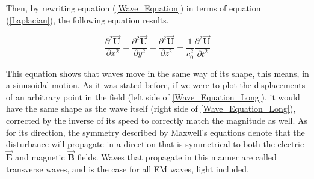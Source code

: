 Then, by rewriting equation (\ref{Wave_Equation}) in terms of equation (\ref{Laplacian}), the following equation results.

\begin{equation}
    \frac{\partial^2 \overrightarrow{\textbf{U}}}{\partial x^2} + \frac{\partial^2 \overrightarrow{\textbf{U}}}{\partial y^2} + \frac{\partial^2 \overrightarrow{\textbf{U}}}{\partial z^2} = \frac{1}{c_0^2}\frac{\partial^2 \overrightarrow{\textbf{U}}}{\partial t^2}
    \label{Wave_Equation_Long}
\end{equation}

This equation shows that waves move in the same way of its shape, this means, in a sinusoidal motion. As it was stated before, if we were to plot the displacements of an arbitrary point in the field (left side of \ref{Wave_Equation_Long}), it would have the same shape as the wave itself (right side of \ref{Wave_Equation_Long}), corrected by the inverse of its speed to correctly match the magnitude as well. As for its direction, the symmetry described by Maxwell's equations denote that the disturbance will propagate in a direction that is symmetrical to both the electric $\overrightarrow{\textbf{E}}$ and magnetic $\overrightarrow{\textbf{B}}$ fields. Waves that propagate in this manner are called transverse waves, and is the case for all EM waves, light included. 


